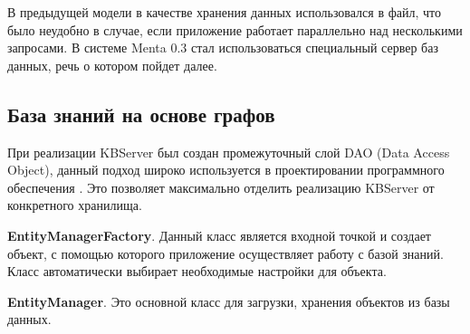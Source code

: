 В предыдущей модели в качестве хранения данных использовался в файл, что было неудобно в случае, если приложение работает параллельно над несколькими запросами. В системе Menta 0.3 стал использоваться специальный сервер баз данных, речь о котором пойдет далее.

\subsection{База знаний на основе графов}
При реализации KBServer был создан промежуточный слой DAO (Data Access Object), данный подход широко используется в проектировании программного обеспечения \cite{THREELAYERARCH}. Это позволяет максимально отделить реализацию KBServer от конкретного хранилища. \par 

\textbf{EntityManagerFactory}. Данный класс является входной точкой и создает объект, с помощью которого приложение осуществляет работу с базой знаний. Класс автоматически выбирает необходимые настройки для объекта. \par

\textbf{EntityManager}. Это основной класс для загрузки, хранения объектов из базы данных.\par

